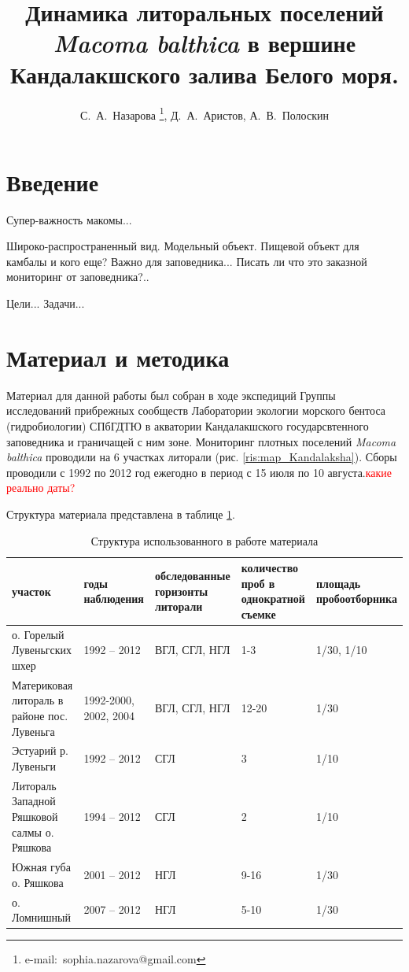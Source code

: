 \documentclass[12pt, a4paper]{article}
\title{Динамика литоральных поселений {\it Macoma balthica} в вершине Кандалакшского залива Белого моря.}
\author{С.~А.~Назарова \thanks{e-mail:~sophia.nazarova@gmail.com}, Д.~А.~Аристов, А.~В.~Полоскин}
\begin{document}
\maketitle

\section{Введение}
Супер-важность макомы...

Широко-распространенный вид. 
Модельный объект.
Пищевой объект для камбалы и кого еще?
Важно для заповедника...
Писать ли что это заказной мониторинг от заповедника?..

Цели...
Задачи...

\section{Материал и методика}
Материал для данной работы был собран в ходе экспедиций Группы исследований прибрежных сообществ Лаборатории экологии морского бентоса (гидробиологии) СПбГДТЮ в акватории Кандалакшского государсвтенного заповедника и граничащей с ним зоне. 
Мониторинг плотных поселений {\it Macoma balthica} проводили на 6 участках литорали (рис. \ref{ris:map_Kandalaksha}).
Сборы проводили с 1992 по 2012 год ежегодно в период с 15 июля по 10 августа.\textcolor{red}{какие реально даты?}

Структура материала представлена в таблице \ref{tab:material_Kandalaksha}.
\begin{table}
\begin{tabular}{|*{5}{p{}|}} \hline
участок & годы наблюдения & обследованные горизонты литорали & количество проб в однократной съемке & площадь пробоотборника  \\ \hline
о. Горелый Лувеньгских шхер & 1992 -- 2012 & ВГЛ, СГЛ, НГЛ & 1-3 & 1/30, 1/10 \\ \hline
Материковая литораль в районе пос. Лувеньга & 1992-2000, 2002, 2004 & ВГЛ, СГЛ, НГЛ & 12-20 & 1/30 \\ \hline
Эстуарий р. Лувеньги & 1992 -- 2012 & СГЛ & 3 & 1/10 \\ \hline
Литораль Западной Ряшковой салмы о. Ряшкова & 1994 -- 2012 & СГЛ & 2 & 1/10 \\ \hline
Южная губа о. Ряшкова & 2001 -- 2012 & НГЛ & 9-16 & 1/30 \\ \hline
о. Ломнишный & 2007 -- 2012 & НГЛ & 5-10 & 1/30  \\ \hline
\end{tabular}
\caption{Структура использованного в работе материала}
\label{tab:material_Kandalaksha}
\end{table}
\end{document}
